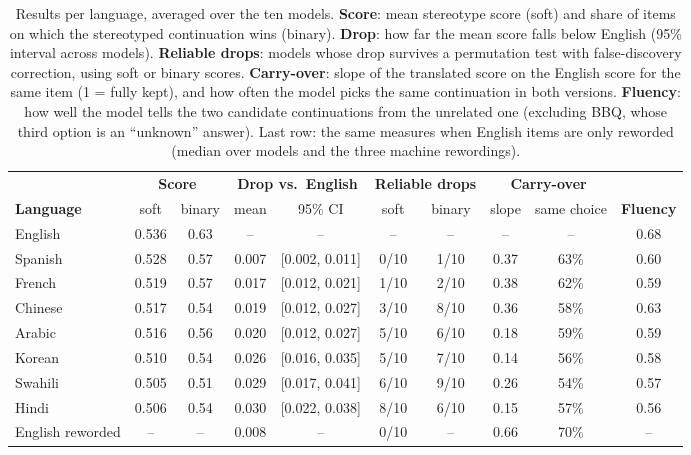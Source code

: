 \begin{table}[t]
\centering
\small
\setlength{\tabcolsep}{5pt}
\begin{tabular}{lccccccccc}
\toprule
 & \multicolumn{2}{c}{\textbf{Score}} & \multicolumn{2}{c}{\textbf{Drop vs.\ English}} & \multicolumn{2}{c}{\textbf{Reliable drops}} & \multicolumn{2}{c}{\textbf{Carry-over}} & \\
\cmidrule(lr){2-3}\cmidrule(lr){4-5}\cmidrule(lr){6-7}\cmidrule(lr){8-9}
\textbf{Language} & soft & binary & mean & 95\% CI & soft & binary & slope & same choice & \textbf{Fluency} \\
\midrule
English & 0.536 & 0.63 & -- & -- & -- & -- & -- & -- & 0.68 \\
\midrule
Spanish & 0.528 & 0.57 & 0.007 & [0.002, 0.011] & 0/10 & 1/10 & 0.37 & 63\% & 0.60 \\
French & 0.519 & 0.57 & 0.017 & [0.012, 0.021] & 1/10 & 2/10 & 0.38 & 62\% & 0.59 \\
Chinese & 0.517 & 0.54 & 0.019 & [0.012, 0.027] & 3/10 & 8/10 & 0.36 & 58\% & 0.63 \\
Arabic & 0.516 & 0.56 & 0.020 & [0.012, 0.027] & 5/10 & 6/10 & 0.18 & 59\% & 0.59 \\
Korean & 0.510 & 0.54 & 0.026 & [0.016, 0.035] & 5/10 & 7/10 & 0.14 & 56\% & 0.58 \\
Swahili & 0.505 & 0.51 & 0.029 & [0.017, 0.041] & 6/10 & 9/10 & 0.26 & 54\% & 0.57 \\
Hindi & 0.506 & 0.54 & 0.030 & [0.022, 0.038] & 8/10 & 6/10 & 0.15 & 57\% & 0.56 \\
\midrule
English reworded & -- & -- & 0.008 & -- & 0/10 & -- & 0.66 & 70\% & -- \\
\bottomrule
\end{tabular}
\caption{Results per language, averaged over the ten models. \textbf{Score}: mean stereotype score (soft) and share of items on which the stereotyped continuation wins (binary). \textbf{Drop}: how far the mean score falls below English (95\% interval across models). \textbf{Reliable drops}: models whose drop survives a permutation test with false-discovery correction, using soft or binary scores. \textbf{Carry-over}: slope of the translated score on the English score for the same item (1 = fully kept), and how often the model picks the same continuation in both versions. \textbf{Fluency}: how well the model tells the two candidate continuations from the unrelated one (excluding BBQ, whose third option is an ``unknown'' answer). Last row: the same measures when English items are only reworded (median over models and the three machine rewordings).}
\label{tab:languages}
\end{table}
